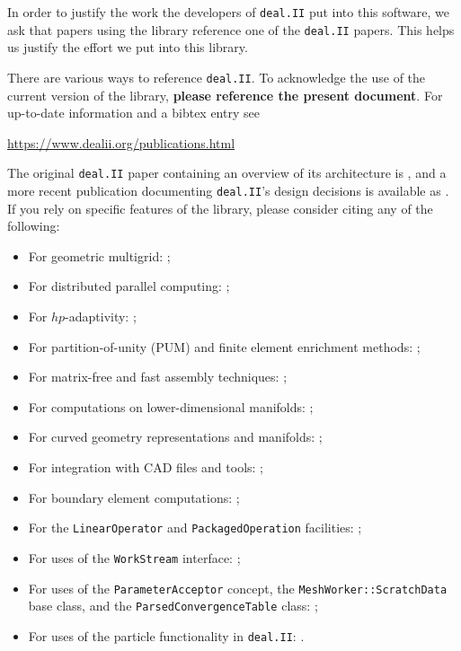 \documentclass{ansarticle-preprint}
\newcommand{\specialword}[1]{\texttt{#1}}
\newcommand{\dealii}{{\specialword{deal.II}}\xspace}
\begin{document}
In order to justify the work the developers of \dealii put into this
software, we ask that papers using the library reference one of the
\dealii papers. This helps us justify the effort we put into this library.

There are various ways to reference \dealii. To acknowledge the use of
the current version of the library, \textbf{please reference the present
  document}. For up-to-date information and a bibtex entry
see
\begin{center}
  \url{https://www.dealii.org/publications.html}
\end{center}

The original \dealii paper containing an overview of its
architecture is \cite{BangerthHartmannKanschat2007}, and a more recent
publication documenting \dealii's design decisions is available as \cite{dealII2020design}. If you rely on
specific features of the library, please consider citing any of the
following:
\begin{multicols}{2}
  \vspace*{-36pt}
  \begin{itemize}[leftmargin=4mm]
    \item For geometric multigrid: \cite{Kanschat2004,JanssenKanschat2011,ClevengerHeisterKanschatKronbichler2019, munch2022gc};
    \item For distributed parallel computing: \cite{BangerthBursteddeHeisterKronbichler11};
    \item For $hp$-adaptivity: \cite{BangerthKayserHerold2007,fehling2022};
    \item For partition-of-unity (PUM) and finite element enrichment methods:
           \cite{Davydov2016};
    \item For matrix-free and fast assembly techniques:
          \cite{KronbichlerKormann2012,KronbichlerKormann2019};
    \item For computations on lower-dimensional manifolds:
          \cite{DeSimoneHeltaiManigrasso2009};
    \item For curved geometry representations and manifolds:
          \cite{HeltaiBangerthKronbichlerMola2019};
    \item For integration with CAD files and tools:
          \cite{HeltaiMola2015};
    \item For boundary element computations:
          \cite{GiulianiMolaHeltai-2018-a};
    \item For the \texttt{LinearOperator} and
      \texttt{Packaged\-Operation} facilities:
          \cite{MaierBardelloniHeltai-2016-a,MaierBardelloniHeltai-2016-b};
    \item For uses of the \texttt{WorkStream} interface:
          \cite{TKB16};
    \item For uses of the \texttt{ParameterAcceptor} concept, the
          \texttt{MeshWorker::ScratchData} base class, and the
          \texttt{ParsedConvergenceTable} class:
          \cite{SartoriGiulianiBardelloni-2018-a};
    \item For uses of the particle functionality in \dealii:
          \cite{GLHPB18}.
          \vfill\null
  \end{itemize}
\end{multicols}
\end{document}
